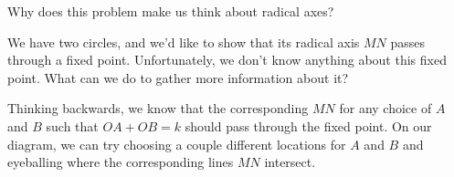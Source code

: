 Why does this problem make us think about radical axes?







We have two circles, and we'd like to show that its radical axis $MN$ passes through a fixed point. Unfortunately, we don't know anything about this fixed point. What can we do to gather more information about it?



Thinking backwards, we know that the corresponding $MN$ for any choice of $A$ and $B$ such that $OA+OB=k$ should pass through the fixed point. On our diagram, we can try choosing a couple different locations for $A$ and $B$ and eyeballing where the corresponding lines $MN$ intersect.




